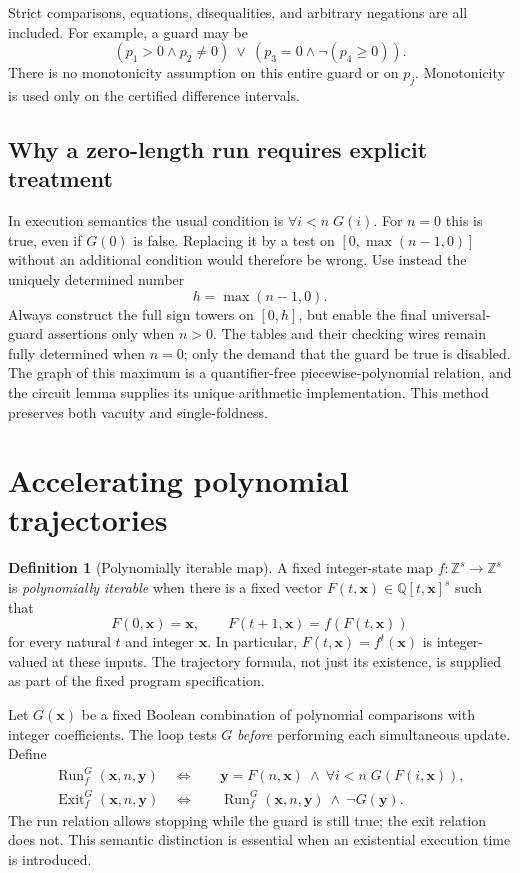 \documentclass[11pt,a4paper]{article}
\theoremstyle{definition}
\newtheorem{definition}[definition]{Definition}
\theoremstyle{remark}
\newcommand{\Z}{\mathbb Z}
\newcommand{\Q}{\mathbb Q}
\newcommand{\Run}{\operatorname{Run}}
\newcommand{\Exit}{\operatorname{Exit}}
\newcommand{\srctag}[1]{\texorpdfstring{\hspace{0.5em}{\normalfont\small\color{accent}[#1]}}{ [#1]}}
\begin{document}
Strict comparisons, equations, disequalities, and arbitrary negations are
all included. For example, a guard may be
\[
 (p_1>0\wedge p_2\neq0)\ \vee\ (p_3=0\wedge\neg(p_4\geq0)).
\]
There is no monotonicity assumption on this entire guard or on $p_j$.
Monotonicity is used only on the certified difference intervals.

\subsection{Why a zero-length run requires explicit treatment}
In execution semantics the usual condition is $\forall i<n\;G(i)$.
For $n=0$ this is true, even if $G(0)$ is false. Replacing it by a test on
$[0,\max(n-1,0)]$ without an additional condition would therefore be wrong.
Use instead the uniquely determined number
\[
 h=\max(n-1,0).
\]
Always construct the full sign towers on $[0,h]$, but enable the final
universal-guard assertions only when $n>0$. The tables and their checking
wires remain fully determined when $n=0$; only the demand that the guard be
true is disabled. The graph of this maximum is a quantifier-free
piecewise-polynomial relation, and the circuit lemma supplies its unique
arithmetic implementation. This method preserves both vacuity and
single-foldness.

\section{Accelerating polynomial trajectories\srctag{02}}
\label{cdc:pt:sec:trajectories}

\begin{definition}[Polynomially iterable map]
A fixed integer-state map $f:\Z^s\to\Z^s$ is \emph{polynomially iterable}
when there is a fixed vector
$F(t,\boldsymbol x)\in\Q[t,\boldsymbol x]^s$ such that
\[
 F(0,\boldsymbol x)=\boldsymbol x,
 \qquad F(t+1,\boldsymbol x)=f(F(t,\boldsymbol x))
\]
for every natural $t$ and integer $\boldsymbol x$. In particular,
$F(t,\boldsymbol x)=f^t(\boldsymbol x)$ is integer-valued at these inputs.
The trajectory formula, not just its existence, is supplied as part of the
fixed program specification.
\end{definition}

Let $G(\boldsymbol x)$ be a fixed Boolean combination of polynomial
comparisons with integer coefficients. The loop tests $G$ \emph{before}
performing each simultaneous update. Define
\begin{align}
 \Run_f^G(\boldsymbol x,n,\boldsymbol y)
 \quad\Longleftrightarrow\quad&
 \boldsymbol y=F(n,\boldsymbol x)
 \ \wedge\ \forall i<n\;G(F(i,\boldsymbol x)),
 \label{cdc:pt:eq:run}\\
 \Exit_f^G(\boldsymbol x,n,\boldsymbol y)
 \quad\Longleftrightarrow\quad&
 \Run_f^G(\boldsymbol x,n,\boldsymbol y)
 \ \wedge\ \neg G(\boldsymbol y).
 \label{cdc:pt:eq:exit}
\end{align}
The run relation allows stopping while the guard is still true; the exit
relation does not. This semantic distinction is essential when an
existential execution time is introduced.
\end{document}
